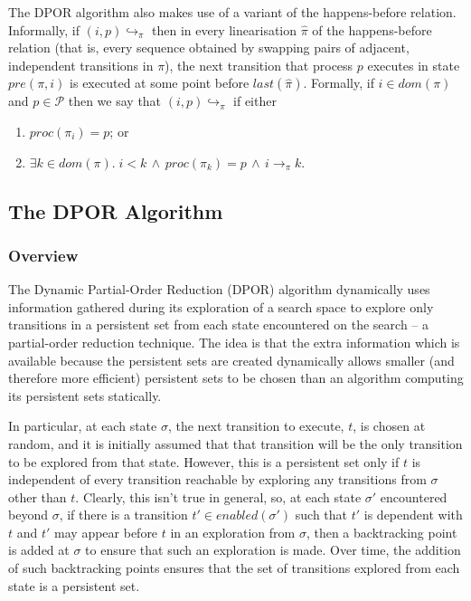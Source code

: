 \documentclass[12pt,a4paper,twoside,openright]{report}
\begin{document}
The DPOR algorithm also makes use of a variant of the
happens-before relation.
Informally, if $(i, p)\!\hookrightarrow_\pi$ then
in every linearisation $\hat{\pi}$ of the
happens-before relation (that is, every sequence
obtained by swapping pairs of adjacent,
independent transitions in $\pi$), the next
transition that process $p$ executes in
state $\textit{pre}(\pi, i)$ is executed
at some point before $\textit{last}(\hat{\pi})$.
Formally, 
if $i \in \textit{dom}(\pi)$ and $p \in
\mathcal{P}$ then we
say that $(i, p)\!\hookrightarrow_\pi$ if
either
\begin{enumerate}
	\item $\textit{proc}(\pi_i) = p$; or
	\item $\exists k \in \textit{dom}(\pi).\;
	i < k \,\wedge\, \textit{proc}(\pi_k) = p
	\,\wedge\, i \longrightarrow_\pi k $.
\end{enumerate}


\subsection{The DPOR Algorithm}

\subsubsection{Overview}

The Dynamic Partial-Order Reduction (DPOR) algorithm
dynamically uses information gathered during its
exploration of a search space to explore only
transitions in a persistent set from each state
encountered on the search -- a partial-order
reduction technique. The idea is that the
extra information which is available because
the persistent sets are created dynamically
allows smaller (and therefore more efficient)
persistent sets to be chosen than an algorithm
computing its persistent sets statically.

In particular, at each state $\sigma$, the
next transition
to execute, $t$, is chosen at random, and it is
initially assumed that that transition will
be the only transition to be explored from
that state. However, this is a persistent
set only if $t$ is
independent of every transition reachable
by exploring any transitions
from $\sigma$ other than $t$. Clearly,
this isn't true in general, so, at each
state $\sigma'$ encountered beyond
$\sigma$, if there is a transition
$t' \in \textit{enabled}(\sigma')$
such that $t'$ is dependent with
$t$ and $t'$ may appear before $t$
in an exploration from $\sigma$, then
a backtracking point is added at
$\sigma$ to ensure that such an
exploration is made. Over time,
the addition of such backtracking points
ensures that the set of transitions
explored from each state is a
persistent set.
\end{document}
